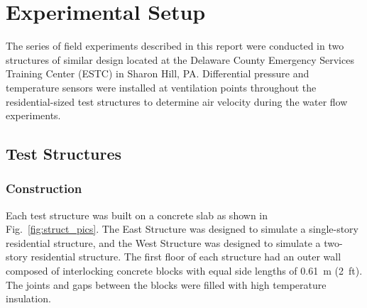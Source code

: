 \documentclass[12pt,oneside]{book}
\begin{document}
\section{Experimental Setup}
\label{sec:exp_setup}
The series of field experiments described in this report were conducted in two structures of similar design located at the Delaware County Emergency Services Training Center (ESTC) in Sharon Hill, PA. Differential pressure and temperature sensors were installed at ventilation points throughout the residential-sized test structures to determine air velocity during the water flow experiments.  

\subsection{Test Structures}
\label{sec:test_structs}

\subsubsection{Construction}
\label{sec:construction}
Each test structure was built on a concrete slab as shown in Fig.~\ref{fig:struct_pics}. The East Structure was designed to simulate a single-story residential structure, and the West Structure was designed to simulate a two-story residential structure. The first floor of each structure had an outer wall composed of interlocking concrete blocks with equal side lengths of 0.61~m (2~ft). The joints and gaps between the blocks were filled with high temperature insulation.
\end{document}
